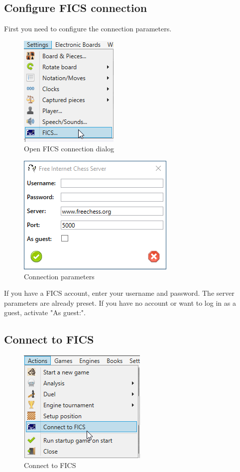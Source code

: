 \documentclass[11pt,a4paper]{article}
\begin{document}
\subsection{Configure FICS connection}

First you need to configure the connection parameters.
\begin{figure}[H]
	\centering
	\includegraphics[scale=1.0]{fics0.png}
	\caption{Open FICS connection dialog}
	\label{fig:fics0}
\end{figure}


\begin{figure}[H]
	\centering
	\includegraphics[scale=1.0]{fics1.png}
	\caption{Connection parameters}
	\label{fig:fics1}
\end{figure}
If you have a FICS account, enter your username and password. The server parameters are already preset. If you have no account or want to log in as a guest, activate "As guest:".

\subsection{Connect to FICS}

\begin{figure}[H]
	\centering
	\includegraphics[scale=1.0]{fics2.png}
	\caption{Connect to FICS}
	\label{fig:fics2}
\end{figure}
\end{document}
